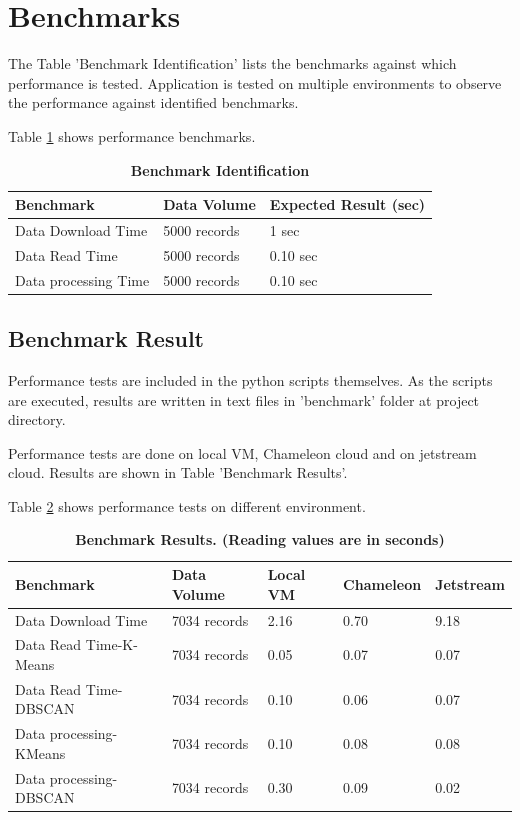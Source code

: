\documentclass[9pt,twocolumn,twoside]{../../styles/osajnl}
\begin{document}
\section{Benchmarks}

The Table 'Benchmark Identification' lists the benchmarks against which performance is tested. Application is tested on multiple environments to observe the performance against identified benchmarks.


\begin{table}[htbp]
  Table \ref{tab:benchmark} shows performance benchmarks.
  
\begin{left}
\caption{\bf Benchmark Identification}
\begin{tabular}{ m{5em} m{2cm} m{2cm} } 
\hline
Benchmark & Data Volume & Expected Result (sec) \\ 
\hline
Data Download Time & 5000 records & 1 sec \\ 
Data Read Time & 5000 records & 0.10 sec \\ 
Data processing Time & 5000 records & 0.10 sec \\ 

\hline
\end{tabular}
  \label{tab:benchmark}
\end{left}
\end{table} 


\subsection {Benchmark Result}

Performance tests are included in the python scripts themselves. As the scripts are executed, results are written in text files in 'benchmark' folder at project directory.

Performance tests are done on local VM, Chameleon cloud and on jetstream cloud. Results are shown in Table 'Benchmark Results'.

\begin{table}[htbp]
  Table \ref{tab: benchmark1} shows performance tests on different environment.
  
\begin{left}
\caption{\bf Benchmark Results. (Reading values are in seconds)}
\begin{tabular}{ m{4em} m{2cm} m{1cm} m{1.5cm} m{1.5cm}} 
\hline
Benchmark & Data Volume & Local VM & Chameleon & Jetstream\\ 
\hline
Data Download Time & 7034 records & 2.16 & 0.70 & 9.18\\ 
Data Read Time-K-Means & 7034 records & 0.05 & 0.07 & 0.07\\ 
Data Read Time-DBSCAN & 7034 records & 0.10 & 0.06 & 0.07\\ 
Data processing-KMeans & 7034 records & 0.10 & 0.08 & 0.08\\ 
Data processing-DBSCAN & 7034 records & 0.30 & 0.09 & 0.02\\ 

\hline
\end{tabular}
  \label{tab: benchmark1}
\end{left}
\end{table} 
\end{document}
